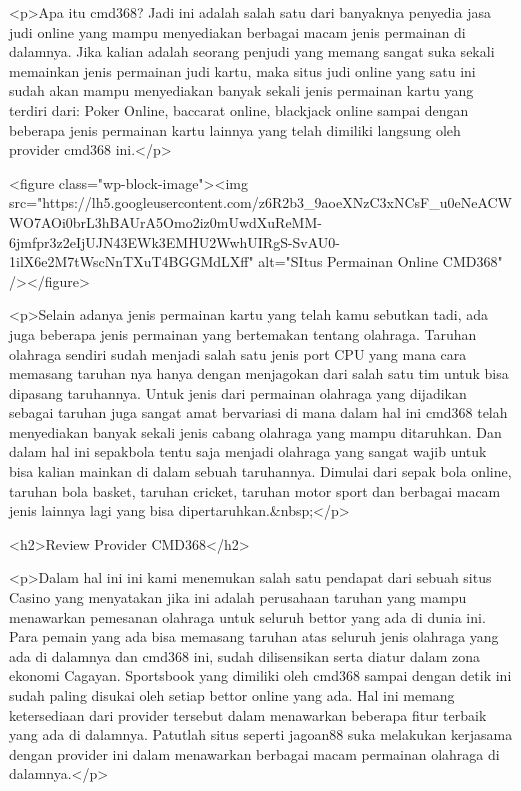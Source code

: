 <p>Apa itu cmd368? Jadi ini adalah salah satu dari banyaknya penyedia jasa judi online yang mampu menyediakan berbagai macam jenis permainan di dalamnya. Jika kalian adalah seorang penjudi yang memang sangat suka sekali memainkan jenis permainan judi kartu, maka situs judi online yang satu ini sudah akan mampu menyediakan banyak sekali jenis permainan kartu yang terdiri dari: Poker Online, baccarat online, blackjack online sampai dengan beberapa jenis permainan kartu lainnya yang telah dimiliki langsung oleh provider cmd368 ini.</p>



<figure class="wp-block-image"><img src="https://lh5.googleusercontent.com/z6R2b3_9aoeXNzC3xNCsF_u0eNeACWWO7AOi0brL3hBAUrA5Omo2iz0mUwdXuReMM-6jmfpr3z2eIjUJN43EWk3EMHU2WwhUIRgS-SvAU0-1ilX6e2M7tWscNnTXuT4BGGMdLXff" alt="SItus Permainan Online CMD368" /></figure>



<p>Selain adanya jenis permainan kartu yang telah kamu sebutkan tadi, ada juga beberapa jenis permainan yang bertemakan tentang olahraga. Taruhan olahraga sendiri sudah menjadi salah satu jenis port CPU yang mana cara memasang taruhan nya hanya dengan menjagokan dari salah satu tim untuk bisa dipasang taruhannya. Untuk jenis dari permainan olahraga yang dijadikan sebagai taruhan juga sangat amat bervariasi di mana dalam hal ini cmd368 telah menyediakan banyak sekali jenis cabang olahraga yang mampu ditaruhkan. Dan dalam hal ini sepakbola tentu saja menjadi olahraga yang sangat wajib untuk bisa kalian mainkan di dalam sebuah taruhannya. Dimulai dari sepak bola online, taruhan bola basket, taruhan cricket, taruhan motor sport dan berbagai macam jenis lainnya lagi yang bisa dipertaruhkan.&nbsp;</p>



<h2>Review Provider CMD368</h2>



<p>Dalam hal ini ini kami menemukan salah satu pendapat dari sebuah situs Casino yang menyatakan jika ini adalah perusahaan taruhan yang mampu menawarkan pemesanan olahraga untuk seluruh bettor yang ada di dunia ini. Para pemain yang ada bisa memasang taruhan atas seluruh jenis olahraga yang ada di dalamnya dan cmd368 ini, sudah dilisensikan serta diatur dalam zona ekonomi Cagayan. Sportsbook yang dimiliki oleh cmd368 sampai dengan detik ini sudah paling disukai oleh setiap bettor online yang ada. Hal ini memang ketersediaan dari provider tersebut dalam menawarkan beberapa fitur terbaik yang ada di dalamnya. Patutlah situs seperti jagoan88 suka melakukan kerjasama dengan provider ini dalam menawarkan berbagai macam permainan olahraga di dalamnya.</p>



